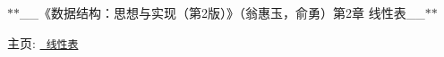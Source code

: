 $\ast$$\ast$\+\_\+\+\_\+《数据结构：思想与实现（第2版）》（翁惠玉，俞勇）第2章 线性表\+\_\+\+\_\+$\ast$$\ast$

主页\+: \href{https://grwei.github.io/data-structure-homework/DS_Ch2/doc/html/index.html}{\texttt{ 线性表}} 